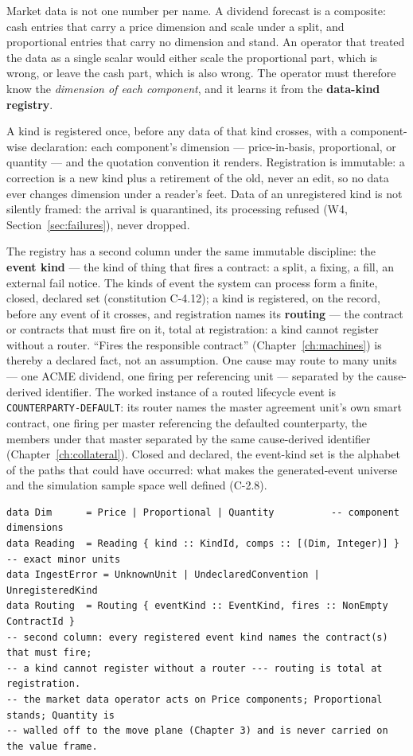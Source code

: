 \documentclass[11pt,a4paper]{article}
\begin{document}
Market data is not one number per name. A dividend forecast is a composite: cash entries
that carry a price dimension and scale under a split, and proportional entries that carry
no dimension and stand. An operator that treated the data as a single scalar would either
scale the proportional part, which is wrong, or leave the cash part, which is also wrong.
The operator must therefore know the \emph{dimension of each component}, and it learns it
from the \textbf{data-kind registry}.

A kind is registered once, before any data of that kind crosses, with a component-wise
declaration: each component's dimension --- price-in-basis, proportional, or quantity ---
and the quotation convention it renders. Registration is immutable: a correction is a new
kind plus a retirement of the old, never an edit, so no data ever changes dimension under
a reader's feet. Data of an unregistered kind is not silently framed: the arrival is
quarantined, its processing refused (W4, Section~\ref{sec:failures}), never dropped.

The registry has a second column under the same immutable discipline: the \textbf{event
kind} --- the kind of thing that fires a contract: a split, a fixing, a fill, an external
fail notice. The kinds of event the system can process form a finite, closed, declared set
(constitution C-4.12); a kind is registered, on the record, before any
event of it crosses, and registration names its \textbf{routing} --- the contract or
contracts that must fire on it, total at registration: a kind cannot register without a
router. ``Fires the responsible contract'' (Chapter~\ref{ch:machines}) is thereby a
declared fact, not an assumption. One cause may route to many units --- one ACME dividend,
one firing per referencing unit --- separated by the cause-derived identifier. The worked
instance of a routed lifecycle event is \texttt{COUNTERPARTY-DEFAULT}: its router names the
master agreement unit's own smart contract, one firing per master referencing the defaulted
counterparty, the members under that master separated by the same cause-derived identifier
(Chapter~\ref{ch:collateral}). Closed and
declared, the event-kind set is the alphabet of the paths that could have occurred: what
makes the generated-event universe and the simulation sample space well defined (C-2.8).

\begin{lstlisting}
data Dim      = Price | Proportional | Quantity          -- component dimensions
data Reading  = Reading { kind :: KindId, comps :: [(Dim, Integer)] }  -- exact minor units
data IngestError = UnknownUnit | UndeclaredConvention | UnregisteredKind
data Routing  = Routing { eventKind :: EventKind, fires :: NonEmpty ContractId }
-- second column: every registered event kind names the contract(s) that must fire;
-- a kind cannot register without a router --- routing is total at registration.
-- the market data operator acts on Price components; Proportional stands; Quantity is
-- walled off to the move plane (Chapter 3) and is never carried on the value frame.
\end{lstlisting}
\end{document}
